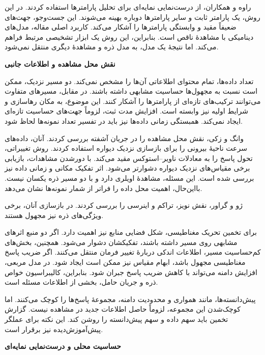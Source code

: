 راوه و همکاران، از درست‌نمایی نمایه‌ای برای تحلیل پارامترها استفاده کردند.
در این روش، یک پارامتر ثابت و سایر پارامترها دوباره بهینه می‌شوند.
این جست‌وجو، جهت‌های ضعیفاً مقید و وابستگی پارامترها را آشکار می‌کند.
کاربرد اصلی مقاله، مدل‌های دینامیکی با مشاهدهٔ ناقص است.
بنابراین، این روش یک ابزار تشخیصی مرتبط فراهم می‌کند.
اما نتیجهٔ یک مدل، به مدل ذره و مشاهدهٔ دیگری منتقل نمی‌شود.
\cite{Raue2009ProfileLikelihood}

\textbf{نقش محل مشاهده و اطلاعات جانبی}

تعداد داده‌ها، تمام محتوای اطلاعاتی آن‌ها را مشخص نمی‌کند.
دو مسیر نزدیک، ممکن است نسبت به مجهول‌ها حساسیت مشابهی داشته باشند.
در مقابل، مسیرهای متفاوت می‌توانند ترکیب‌های تازه‌ای از پارامترها را آشکار کنند.
این موضوع، به مکان رهاسازی و شرایط اولیه نیز وابسته است.
افزایش مدت ثبت، لزوماً جهت‌های حساسیت تازه‌ای ایجاد نمی‌کند.
همبستگی زمانی داده‌ها نیز باید در تفسیر تعداد نمونه‌ها لحاظ شود.

وانگ و زکی، نقش محل مشاهده را در جریان آشفته بررسی کردند.
آنان، داده‌های سرعت ناحیهٔ بیرونی را برای بازسازی نزدیک دیواره استفاده کردند.
روش تغییراتی، تحول پاسخ را به معادلات ناویر–استوکس مقید می‌کند.
با دورشدن مشاهدات، بازیابی برخی مقیاس‌های نزدیک دیواره دشوارتر می‌شود.
اثر تفکیک مکانی و زمانی داده نیز بررسی شده است.
این مسئله، مشاهدهٔ اویلری دارد و با دو مسیر ذره یکسان نیست.
بااین‌حال، اهمیت محل داده را فراتر از شمار نمونه‌ها نشان می‌دهد.
\cite{WangZaki2025OuterObservations}

ژو و گراور، نقش نویز، تراکم و اینرسی را بررسی کردند.
در بازسازی آنان، برخی ویژگی‌های ذره نیز مجهول هستند.
\cite{ZhouGrauer2026Joint}

برای تخمین تحریک مغناطیسی، شکل فضایی منابع نیز اهمیت دارد.
اگر دو منبع اثرهای مشابهی روی مسیر داشته باشند، تفکیکشان دشوار می‌شود.
همچنین، بخش‌های کم‌حساسیت مسیر، اطلاعات اندکی دربارهٔ تغییر فرمان منتقل می‌کنند.
اگر ضریب پاسخ مغناطیسی مجهول باشد، ابهام مقیاس نیز ممکن است ایجاد شود.
در مدل مربعی، افزایش دامنه می‌تواند با کاهش ضریب پاسخ جبران شود.
بنابراین، کالیبراسیون خواص ذره و جریان حامل، بخشی از اطلاعات مسئله است.

پیش‌دانسته‌ها، مانند همواری و محدودیت دامنه، مجموعهٔ پاسخ‌ها را کوچک می‌کنند.
اما کوچک‌شدن این مجموعه، لزوماً حاصل اطلاعات جدید در مشاهده نیست.
گزارش تخمین باید سهم داده و سهم پیش‌دانسته را روشن کند.
این نکته برای عملگر پیش‌آموزش‌دیده نیز برقرار است.

\textbf{حساسیت محلی و درست‌نمایی نمایه‌ای}


